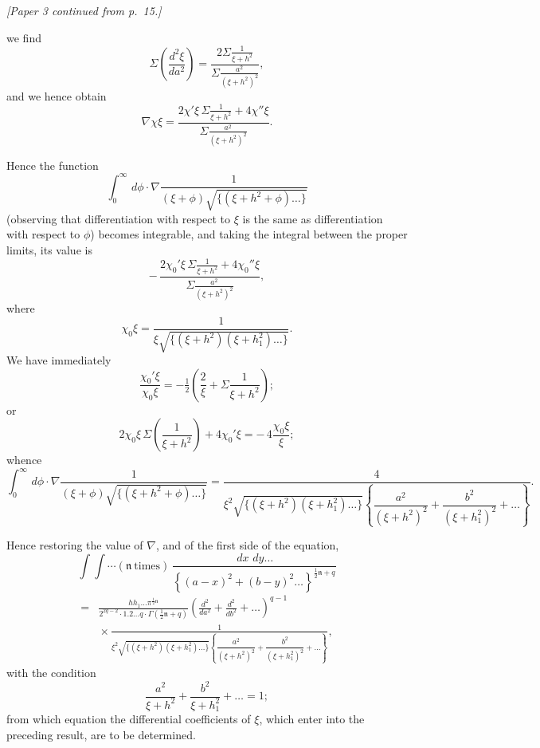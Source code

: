 \documentclass[11pt]{article}
\providecommand{\dd}{\,d}
\providecommand{\half}{\tfrac12}
\providecommand{\n}{\mathfrak{n}}
\begin{document}
\setlength{\parindent}{1.5em}


\noindent\textit{[Paper 3 continued from p.~15.]}

\medskip

we find
\[
\Sigma\left(\frac{d^{2}\xi}{da^{2}}\right)
= \frac{2\Sigma\frac{1}{\xi+h^{2}}}{\Sigma\frac{a^{2}}{(\xi+h^{2})^{2}}},
\]
and we hence obtain
\[
\nabla \chi \xi =
\frac{2\chi'\xi\,\Sigma\frac{1}{\xi+h^{2}}+4\chi''\xi}
{\Sigma\frac{a^{2}}{(\xi+h^{2})^{2}}}.
\]

Hence the function
\[
\int_{0}^{\infty}\dd\phi\cdot
\nabla\frac{1}{(\xi+\phi)\sqrt{\{(\xi+h^{2}+\phi)\ldots\}}}
\]
(observing that differentiation with respect to $\xi$ is the same as differentiation with
respect to $\phi$) becomes integrable, and taking the integral between the proper limits, its
value is
\[
-\,\frac{2\chi_{0}'\xi\,\Sigma\frac{1}{\xi+h^{2}}+4\chi_{0}''\xi}
{\Sigma\frac{a^{2}}{(\xi+h^{2})^{2}}},
\]
where
\[
\chi_{0}\xi=\frac{1}{\xi\sqrt{\{(\xi+h^{2})(\xi+h_{1}^{2})\ldots\}}}.
\]
We have immediately
\[
\frac{\chi_{0}'\xi}{\chi_{0}\xi}
=-\half\left(\frac{2}{\xi}+\Sigma\frac{1}{\xi+h^{2}}\right);
\]
or
\[
2\chi_{0}\xi\,\Sigma\left(\frac{1}{\xi+h^{2}}\right)+4\chi_{0}'\xi
=-\,4\frac{\chi_{0}\xi}{\xi};
\]
whence
\[
\int_{0}^{\infty}\dd\phi\cdot
\nabla\frac{1}{(\xi+\phi)\sqrt{\{(\xi+h^{2}+\phi)\ldots\}}}
=
\frac{4}{\xi^{2}\sqrt{\{(\xi+h^{2})(\xi+h_{1}^{2})\ldots\}}
\left\{\dfrac{a^{2}}{(\xi+h^{2})^{2}}+\dfrac{b^{2}}{(\xi+h_{1}^{2})^{2}}+\ldots\right\}}.
\]

Hence restoring the value of $\nabla$, and of the first side of the equation,
\[
\int\!\!\int\cdots(\n\ \text{times})\,
\frac{\dd x\,\dd y\ldots}
{\left\{(a-x)^{2}+(b-y)^{2}\ldots\right\}^{\frac12\n+q}}
\]
\[
\begin{aligned}
={}&
\frac{hh_{1}\ldots\pi^{\frac12\n}}{2^{2q-2}\cdot 1.2\ldots q\cdot
\Gamma(\frac12\n+q)}
\left(\frac{d^{2}}{da^{2}}+\frac{d^{2}}{db^{2}}+\ldots\right)^{q-1}\\
&{}\times
\frac{1}
{\xi^{2}\sqrt{\{(\xi+h^{2})(\xi+h_{1}^{2})\ldots\}}
\left\{\dfrac{a^{2}}{(\xi+h^{2})^{2}}+\dfrac{b^{2}}{(\xi+h_{1}^{2})^{2}}+\ldots\right\}},
\end{aligned}
\]
with the condition
\[
\frac{a^{2}}{\xi+h^{2}}+\frac{b^{2}}{\xi+h_{1}^{2}}+\ldots=1;
\]
from which equation the differential coefficients of $\xi$, which enter into the preceding
result, are to be determined.
\end{document}
